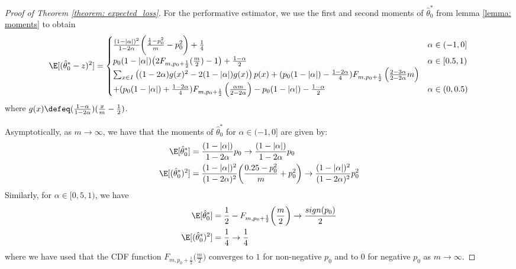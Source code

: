 \begin{proof}[Proof of Theorem \ref{theorem: expected_loss}]
For the performative estimator, we use the first and second moments of $\hat{\theta}_0^\ast$ from lemma \ref{lemma: moments} to obtain
\begin{align*}
\E[(\hat{\theta}_0^\ast - z)^2] = 
\begin{cases}
\frac{(1 - |\alpha|)^2}{1-2\alpha} \bigg( \frac{\frac14 - p_0^2}{m} - p_0^2 \bigg) + \frac14 & \alpha \in (-1, 0]\\
p_0 (1 - |\alpha|) \big(2F_{m, p_0 + \frac12}(\frac{m}{2}) - 1\big) + \frac{1-\alpha}{2} & \alpha \in [0.5, 1)\\
\sum_{x \in I}\left( (1 - 2\alpha)g(x)^2 - 2(1 - |\alpha|)g(x) \right) p(x) + (p_0(1-|\alpha|) - \frac{1-2\alpha}{4})F_{m, p_0 + \frac{1}{2}}\left( \frac{2 - 3\alpha}{2 - 2\alpha}m \right) & \\
 + (p_0(1-|\alpha|) + \frac{1-2\alpha}{4})F_{m, p_0 + \frac{1}{2}}\left( \frac{\alpha m}{2 - 2\alpha} \right) - p_0 (1-|\alpha|) - \frac{1-\alpha}{2}& \alpha \in (0, 0.5)
\end{cases}
\end{align*}
where $g(x) \defeq (\frac{1-\alpha}{1-2\alpha})(\frac{x}{m} - \frac{1}{2})$.

Asymptotically, as $m \to \infty$, we have that the moments of $\hat{\theta}_0^\ast$ for $\alpha \in (-1, 0]$ are given by:
\begin{align*}
\E[\hat{\theta}_0^\ast] &= \frac{(1-|\alpha|)}{1-2\alpha} p_0 \to \frac{(1-|\alpha|)}{1-2\alpha} p_0\\
\E[(\hat{\theta}_0^\ast)^2] &= \frac{(1-|\alpha|)^2}{(1-2\alpha)^2} \bigg( \frac{0.25 - p_0^2}{m} +  p_0^2\bigg) \to \frac{(1-|\alpha|)^2}{(1-2\alpha)^2} p_0^2
\end{align*}
Similarly, for $\alpha \in [0,5, 1)$, we have 
\begin{align*}
\E[\hat{\theta}_0^\ast] &= \frac12 - F_{m, p_0 + \frac12}\bigg(\frac{m}{2}\bigg) \to \frac{sign(p_0)}{2}\\
\E[(\hat{\theta}_0^\ast)^2] &= \frac14 \to \frac14
\end{align*}
where we have used that the CDF function $F_{m, p_0 + \frac12}\bigg(\frac{m}{2}\bigg)$ converges to $1$ for non-negative $p_0$ and to $0$ for negative $p_0$ as $m\to \infty$. 


\end{proof}
